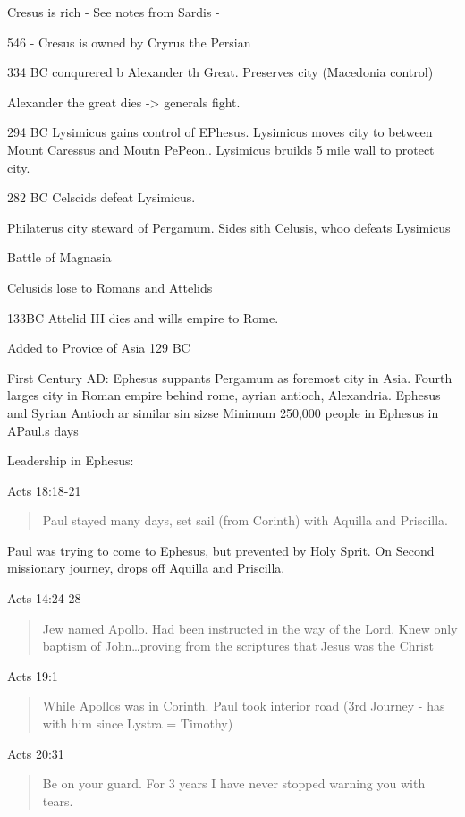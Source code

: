 \documentclass[
]{book}
\begin{document}
Cresus is rich - See notes from Sardis -

546 - Cresus is owned by Cryrus the Persian

334 BC conqurered b Alexander th Great. Preserves city (Macedonia control)

Alexander the great dies -\textgreater{} generals fight.

294 BC Lysimicus gains control of EPhesus. Lysimicus moves city to between Mount Caressus and Moutn PePeon.. Lysimicus bruilds 5 mile wall to protect city.

282 BC Celscids defeat Lysimicus.

Philaterus city steward of Pergamum. Sides sith Celusis, whoo defeats Lysimicus

Battle of Magnasia

Celusids lose to Romans and Attelids

133BC Attelid III dies and wills empire to Rome.

Added to Provice of Asia 129 BC

First Century AD: Ephesus suppants Pergamum as foremost city in Asia. Fourth larges city in Roman empire behind rome, ayrian antioch, Alexandria. Ephesus and Syrian Antioch ar similar sin sizse Minimum 250,000 people in Ephesus in APaul.s days

Leadership in Ephesus:

Acts 18:18-21

\begin{quote}
Paul stayed many days, set sail (from Corinth) with Aquilla and Priscilla.
\end{quote}

Paul was trying to come to Ephesus, but prevented by Holy Sprit. On Second missionary journey, drops off Aquilla and Priscilla.

Acts 14:24-28

\begin{quote}
Jew named Apollo. Had been instructed in the way of the Lord. Knew only baptism of John\ldots proving from the scriptures that Jesus was the Christ
\end{quote}

Acts 19:1

\begin{quote}
While Apollos was in Corinth. Paul took interior road (3rd Journey - has with him since Lystra = Timothy)
\end{quote}

Acts 20:31

\begin{quote}
Be on your guard. For 3 years I have never stopped warning you with tears.
\end{quote}
\end{document}
